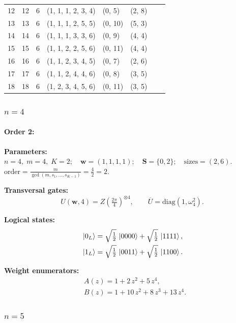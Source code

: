 \documentclass[pdflatex,sn-nature]{sn-jnl}%
\theoremstyle{thmstyleone}%
\theoremstyle{thmstyletwo}%
\theoremstyle{thmstylethree}%
\begin{document}
\begin{appendices}
\begin{table}[t]
\begin{tabular*}{\textwidth}{@{\extracolsep{\fill}}llllllll}
    12  & 12  & 6 & (1, 1, 1, 2, 3, 4)        & (0, 5) & (2, 8) \\
    13  & 13  & 6 & (1, 1, 1, 2, 5, 5)        & (0, 10) & (5, 3)\\
    14  & 14  & 6 & (1, 1, 1, 3, 3, 6)        & (0, 9)  & (4, 4)\\
    15  & 15  & 6 & (1, 1, 2, 2, 5, 6)        & (0, 11) & (4, 4)\\
    16  & 16  & 6 & (1, 1, 2, 3, 4, 5)        & (0, 7) & (2, 6) \\
    17  & 17  & 6 & (1, 1, 2, 4, 4, 6)        & (0, 8) & (3, 5)\\
    18  & 18  & 6 & (1, 2, 3, 4, 5, 6)        & (0, 11) & (3, 5)\\
    \bottomrule
  \end{tabular*}
\end{table}

\subsubsection{$n=4$}
\label{subsubsec:K2n4}
\paragraph{\textbf{Order 2:}}
\noindent\textbf{Parameters:} $n=4,\; m=4,\; K=2;\quad \mathbf w=(1, 1, 1, 1);\quad \mathbf S=\{0, 2\};\quad \text{sizes}=\left(2, 6\right).$ $\displaystyle \text{order}=\frac{m}{\gcd(m,s_1,\dots,s_{K-1})}=\frac{4}{2}=2.$

\noindent\textbf{Transversal gates:}
\[
    U(\mathbf w,4)=Z \left(\tfrac{2\pi}{4}\right)^{\otimes 4},\qquad \overline U=\mathrm{diag}(1,\omega_4^{2}).
\]

\noindent\textbf{Logical states:}
\begin{align*}
    &\ket{0_L} = \sqrt{\tfrac{1}{2}}\,\ket{0000} + \sqrt{\tfrac{1}{2}}\,\ket{1111}, \\
    &\ket{1_L} = \sqrt{\tfrac{1}{2}}\,\ket{0011} + \sqrt{\tfrac{1}{2}}\,\ket{1100}.
\end{align*}

\noindent\textbf{Weight enumerators:}
\begin{align*}
    &A(z) = 1 + 2\,z^{2} + 5\,z^{4}, \\
    &B(z) = 1 + 10\,z^{2} + 8\,z^{3} + 13\,z^{4}.
\end{align*}

\subsubsection{$n=5$}
\label{subsubsec:K2n5}

\end{appendices}
\end{document}
